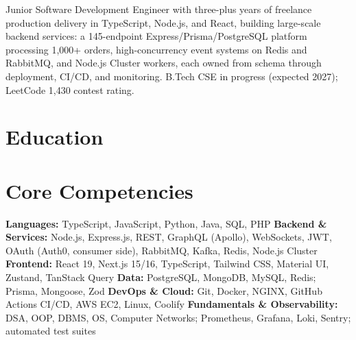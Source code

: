 \documentclass[11pt,a4paper,sans]{moderncv}
\begin{document}
\makecvtitle


\vspace{4pt}
\small{Junior Software Development Engineer with three-plus years of freelance production delivery in TypeScript, Node.js, and React, building large-scale backend services: a 145-endpoint Express/Prisma/PostgreSQL platform processing 1,000+ orders, high-concurrency event systems on Redis and RabbitMQ, and Node.js Cluster workers, each owned from schema through deployment, CI/CD, and monitoring. B.Tech CSE in progress (expected 2027); LeetCode 1,430 contest rating.}


\section{Education}
\vspace{1pt}


\section{Core Competencies}
\vspace{1pt}
\raggedright
\textbf{Languages:} TypeScript, JavaScript, Python, Java, SQL, PHP \textbar{}
\textbf{Backend \& Services:} Node.js, Express.js, REST, GraphQL (Apollo), WebSockets, JWT, OAuth (Auth0, consumer side), RabbitMQ, Kafka, Redis, Node.js Cluster \textbar{}
\textbf{Frontend:} React 19, Next.js 15/16, TypeScript, Tailwind CSS, Material UI, Zustand, TanStack Query \textbar{}
\textbf{Data:} PostgreSQL, MongoDB, MySQL, Redis; Prisma, Mongoose, Zod \textbar{}
\textbf{DevOps \& Cloud:} Git, Docker, NGINX, GitHub Actions CI/CD, AWS EC2, Linux, Coolify \textbar{}
\textbf{Fundamentals \& Observability:} DSA, OOP, DBMS, OS, Computer Networks; Prometheus, Grafana, Loki, Sentry; automated test suites
\par\normalfont
\end{document}
